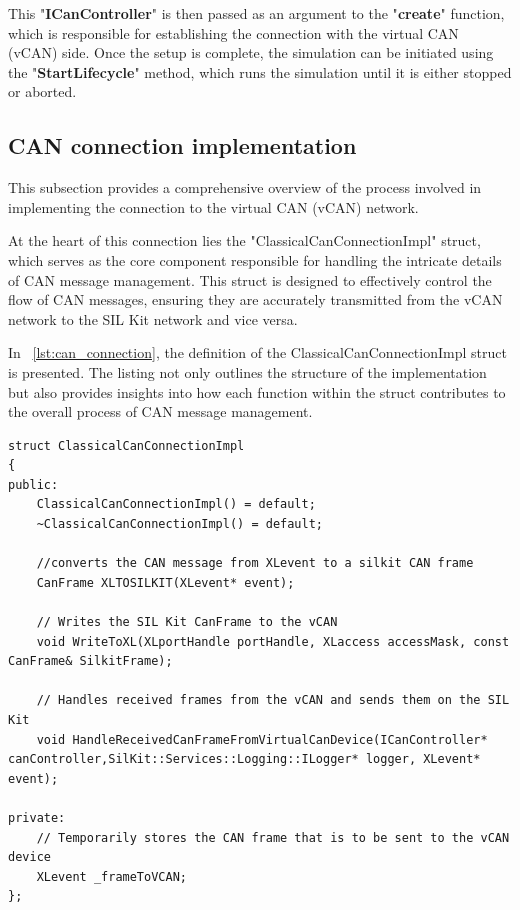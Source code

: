 This "\textbf{ICanController}" is then passed as an argument to the "\textbf{create}" function, which is responsible for establishing the connection with the virtual CAN (vCAN) side. Once the setup is complete, the simulation can be initiated using the "\textbf{StartLifecycle}" method, which runs the simulation until it is either stopped or aborted. \cite{sil_kit_docs}


\subsection{CAN connection implementation}
This subsection provides a comprehensive overview of the process involved in implementing the connection to the virtual CAN (vCAN) network. 

At the heart of this connection lies the "ClassicalCanConnectionImpl" struct, which serves as the core component responsible for handling the intricate details of CAN message management. This struct is designed to effectively control the flow of CAN messages, ensuring they are accurately transmitted from the vCAN network to the SIL Kit network and vice versa. 

In ~\autoref{lst:can_connection}, the definition of the ClassicalCanConnectionImpl struct is presented. The listing not only outlines the structure of the implementation but also provides insights into how each function within the struct contributes to the overall process of CAN message management. 

\newpage

\begin{lstlisting}[caption={The ClassicalCanConnectionImpl struct.}, label={lst:can_connection}]
struct ClassicalCanConnectionImpl
{
public:
    ClassicalCanConnectionImpl() = default;
    ~ClassicalCanConnectionImpl() = default;

    //converts the CAN message from XLevent to a silkit CAN frame 
    CanFrame XLTOSILKIT(XLevent* event);

    // Writes the SIL Kit CanFrame to the vCAN
    void WriteToXL(XLportHandle portHandle, XLaccess accessMask, const CanFrame& SilkitFrame);

    // Handles received frames from the vCAN and sends them on the SIL Kit 
    void HandleReceivedCanFrameFromVirtualCanDevice(ICanController* canController,SilKit::Services::Logging::ILogger* logger, XLevent* event);

private:
    // Temporarily stores the CAN frame that is to be sent to the vCAN device
    XLevent _frameToVCAN;
};
\end{lstlisting}

